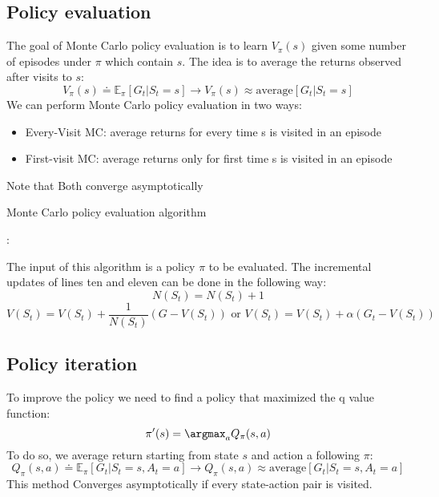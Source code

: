 \subsection{Policy evaluation}
The goal of Monte Carlo policy evaluation is to learn $V_{\pi}(s)$ given some number of episodes under $\pi$ which contain $s$. 
The idea is to average the returns observed after visits to $s$: 
\[V_{\pi}(s)\doteq\mathbb{E}_{\pi}[G_t|S_t=s]\rightarrow V_{\pi}(s)\approx\text{average}[G_t|S_t=s]\]
We can perform Monte Carlo policy evaluation in two ways: 
\begin{itemize}
    \item Every-Visit MC: average returns for every time s is visited in an episode
    \item First-visit MC: average returns only for first time s is visited in an episode
\end{itemize}
Note that Both converge asymptotically
\begin{algorithm}[H]
    \caption{Monte Carlo policy evaluation algorithm}
        \begin{algorithmic}[1]
            \Repeat 
                        : 
                        \EndIf
                    \EndFor
                \EndFor
        \end{algorithmic}
\end{algorithm}
The input of this algorithm is a policy $\pi$ to be evaluated.
The incremental updates of lines ten and eleven can be done in the following way: 
\[N(S_t)=N(S_t)+1\]
\[V(S_t)=V(S_t)+\dfrac{1}{N(S_t)}(G-V(S_t)) \text{  or  } V(S_t)=V(S_t)+\alpha(G_t-V(S_t))\]

\subsection{Policy iteration}
To improve the policy we need to find a policy that maximized the q value function: 
\[\pi^\prime(s)=\argmax_a Q_{\pi}(s,a)\]
To do so, we average return starting from state $s$ and action a following $\pi$:
\[Q_{\pi}(s,a)\doteq\mathbb{E}_{\pi}[G_t|S_t=s,A_t=a]\rightarrow Q_{\pi}(s,a)\approx\text{average}[G_t|S_t=s,A_t=a]\]
This method Converges asymptotically if every state-action pair is visited.  


